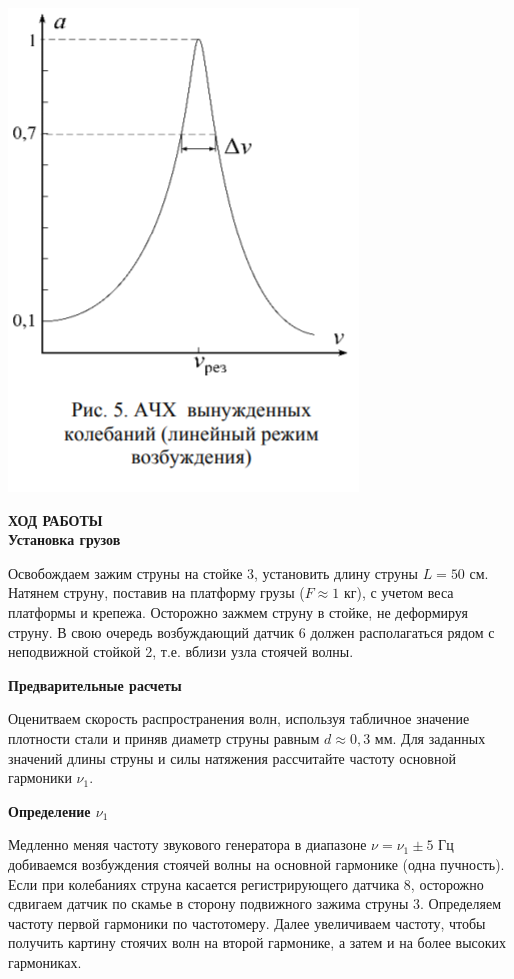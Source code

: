 \documentclass[a4paper,12pt]{article} %
\begin{document}
\begin{center}
\includegraphics[scale=0.8]{1.4.5 6}
\end{center}








\newpage

{\bf ХОД РАБОТЫ}
\\

{\bf Установка грузов} 

Освобождаем зажим струны на стойке 3, установить длину струны $L = 50$ см. Натянем струну, поставив на платформу грузы ($F \approx 1$ кг), с учетом веса платформы и крепежа. Осторожно зажмем струну в стойке, не деформируя струну. В свою очередь возбуждающий датчик 6 должен располагаться рядом с неподвижной
стойкой 2, т.е. вблизи узла стоячей волны.

{\bf Предварительные расчеты}

Оценитваем скорость распространения волн, используя табличное значение плотности стали и
приняв диаметр струны равным $d \approx 0,3$ мм. Для заданных значений длины
струны и силы натяжения рассчитайте частоту основной гармоники $\nu_1$.

{\bf Определение $\nu_1$}

Медленно меняя частоту звукового генератора в диапазоне $\nu = \nu_1 \pm 5 \textbf{ Гц }$ добиваемся возбуждения стоячей волны на основной гармонике (одна пучность). Если при колебаниях струна касается регистрирующего датчика 8,
осторожно сдвигаем датчик по скамье в сторону подвижного зажима
струны 3. Определяем частоту первой гармоники по частотомеру. Далее увеличиваем частоту, чтобы получить картину стоячих волн на второй
гармонике, а затем и на более высоких гармониках.
\end{document}
